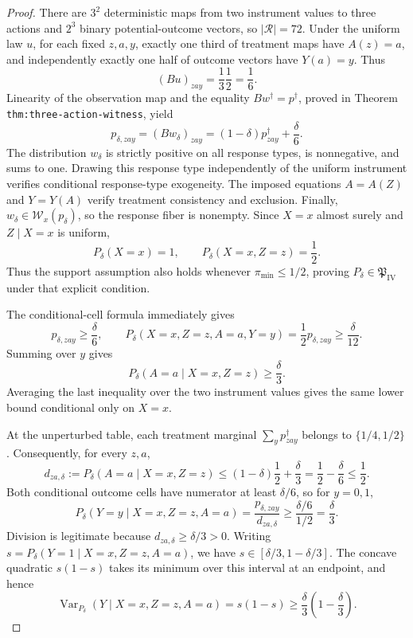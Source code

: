 \documentclass{article}
\begin{document}
\begin{proof}
There are \(3^2\) deterministic maps from two instrument values to three actions and \(2^3\) binary potential-outcome vectors, so \(|\mathcal R|=72\).  Under the uniform law \(u\), for each fixed \(z,a,y\), exactly one third of treatment maps have \(A(z)=a\), and independently exactly one half of outcome vectors have \(Y(a)=y\).  Thus
\[
 (Bu)_{zay}=\frac13\frac12=\frac16.
\]
Linearity of the observation map and the equality \(Bw^\dagger=p^\dagger\), proved in Theorem \texttt{thm:three-action-witness}, yield
\[
 p_{\delta,zay}=(Bw_\delta)_{zay}
 =(1-\delta)p^\dagger_{zay}+\frac{\delta}{6}.
\]
The distribution \(w_\delta\) is strictly positive on all response types, is nonnegative, and sums to one.  Drawing this response type independently of the uniform instrument verifies conditional response-type exogeneity.  The imposed equations \(A=A(Z)\) and \(Y=Y(A)\) verify treatment consistency and exclusion.  Finally, \(w_\delta\in\mathcal W_x(p_\delta)\), so the response fiber is nonempty.  Since \(X=x\) almost surely and \(Z\mid X=x\) is uniform,
\[
 P_\delta(X=x)=1,
 \qquad
 P_\delta(X=x,Z=z)=\frac12.
\]
Thus the support assumption also holds whenever \(\pi_{\min}\leq1/2\), proving \(P_\delta\in\mathfrak P_{\mathrm{IV}}\) under that explicit condition.

The conditional-cell formula immediately gives
\[
 p_{\delta,zay}\geq\frac\delta6,
 \qquad
 P_\delta(X=x,Z=z,A=a,Y=y)
 =\frac12p_{\delta,zay}\geq\frac\delta{12}.
\]
Summing over \(y\) gives
\[
 P_\delta(A=a\mid X=x,Z=z)\geq\frac\delta3.
\]
Averaging the last inequality over the two instrument values gives the same lower bound conditional only on \(X=x\).

At the unperturbed table, each treatment marginal \(\sum_y p^\dagger_{zay}\) belongs to \(\{1/4,1/2\}\).  Consequently, for every \(z,a\),
\[
 d_{za,\delta}:=P_\delta(A=a\mid X=x,Z=z)
 \leq(1-\delta)\frac12+\frac\delta3
 =\frac12-\frac\delta6
 \leq\frac12.
\]
Both conditional outcome cells have numerator at least \(\delta/6\), so for \(y=0,1\),
\[
 P_\delta(Y=y\mid X=x,Z=z,A=a)
 =\frac{p_{\delta,zay}}{d_{za,\delta}}
 \geq\frac{\delta/6}{1/2}
 =\frac\delta3.
\]
Division is legitimate because \(d_{za,\delta}\geq\delta/3>0\).  Writing \(s=P_\delta(Y=1\mid X=x,Z=z,A=a)\), we have \(s\in[\delta/3,1-\delta/3]\).  The concave quadratic \(s(1-s)\) takes its minimum over this interval at an endpoint, and hence
\[
 \operatorname{Var}_{P_\delta}(Y\mid X=x,Z=z,A=a)
 =s(1-s)
 \geq\frac\delta3\left(1-\frac\delta3\right).
\]


\end{proof}
\end{document}
